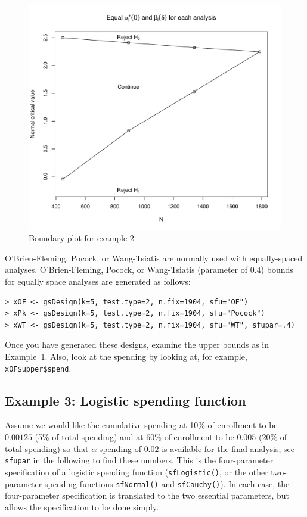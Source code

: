 \begin{center}%
\begin{figure}
\begin{center}
\includegraphics[width=.6\textwidth]{figs/boundplot2.pdf}
\end{center}
\caption{Boundary plot for example 2}
\end{figure}%

\end{center}

O'Brien-Fleming, Pocock, or Wang-Tsiatis are normally used with equally-spaced
analyses. O'Brien-Fleming, Pocock, or Wang-Tsiatis (parameter of 0.4) bounds
for equally space analyses are generated as follows:

\bigskip

\begin{verbatim}
> xOF <- gsDesign(k=5, test.type=2, n.fix=1904, sfu="OF")
> xPk <- gsDesign(k=5, test.type=2, n.fix=1904, sfu="Pocock")
> xWT <- gsDesign(k=5, test.type=2, n.fix=1904, sfu="WT", sfupar=.4)
\end{verbatim}

\bigskip

Once you have generated these designs, examine the upper bounds as in 
Example~1.  Also, look at the spending by looking at, for example,
\texttt{xOF\$upper\$spend}.


\subsection*{Example 3: Logistic spending function}

Assume we would like the cumulative spending at 10\% of enrollment to be
$0.00125$ (5\% of total spending) and at 60\% of enrollment to be $0.005$ 
(20\% of total spending) so that $\alpha$-spending of $0.02$ is available for 
the final analysis; see \texttt{sfupar} in the following to find these 
numbers. This is the four-parameter specification of a logistic spending 
function (\texttt{sfLogistic()}, or the other two-parameter spending functions
\texttt{sfNormal()} and \texttt{sfCauchy()}). In each case, the four-parameter
specification is translated to the two essential parameters, but allows the
specification to be done simply.

